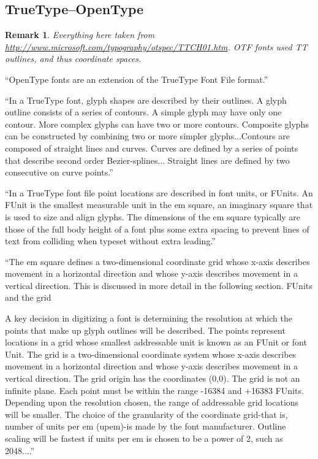 \documentclass[12pt]{tufte-handout}
\numberwithin{equation}{subsection}
\numberwithin{equation}{subsection}
\newtheorem{remark}{Remark}
\newcommand\cspace{coordinate space}
\begin{document}
\begin{appendices}
                \subsection{TrueType--OpenType}
                \label{subs:ttotf}

                \begin{remark}
                  Everything here taken from
                  \url{http://www.microsoft.com/typography/otspec/TTCH01.htm}.
                  OTF fonts used TT outlines, and thus \cspace{}s.
                \end{remark}

                ``OpenType fonts are an extension of the TrueType Font
                File format.''

                ``In a TrueType font, glyph shapes are described by
                their outlines. A glyph outline consists of a series
                of contours. A simple glyph may have only one
                contour. More complex glyphs can have two or more
                contours. Composite glyphs can be constructed by
                combining two or more simpler glyphs...Contours are
                composed of straight lines and curves. Curves are
                defined by a series of points that describe second
                order Bezier-splines... Straight lines are defined by
                two consecutive on curve points.''

                ``In a TrueType font file point locations are
                described in font units, or FUnits. An FUnit is the
                smallest measurable unit in the em square, an
                imaginary square that is used to size and align
                glyphs. The dimensions of the em square typically are
                those of the full body height of a font plus some
                extra spacing to prevent lines of text from colliding
                when typeset without extra leading.''

                ``The em square defines a two-dimensional coordinate grid whose x-axis describes movement in a horizontal direction and whose y-axis describes movement in a vertical direction. This is discussed in more detail in the following section.
FUnits and the grid

A key decision in digitizing a font is determining the resolution at which the points that make up glyph outlines will be described. The points represent locations in a grid whose smallest addressable unit is known as an FUnit or font Unit. The grid is a two-dimensional coordinate system whose x-axis describes movement in a horizontal direction and whose y-axis describes movement in a vertical direction. The grid origin has the coordinates (0,0). The grid is not an infinite plane. Each point must be within the range -16384 and +16383 FUnits. Depending upon the resolution chosen, the range of addressable grid locations will be smaller.
The choice of the granularity of the coordinate grid-that is, number of units per em (upem)-is made by the font manufacturer. Outline scaling will be fastest if units per em is chosen to be a power of 2, such as 2048....''


\end{appendices}
\end{document}
